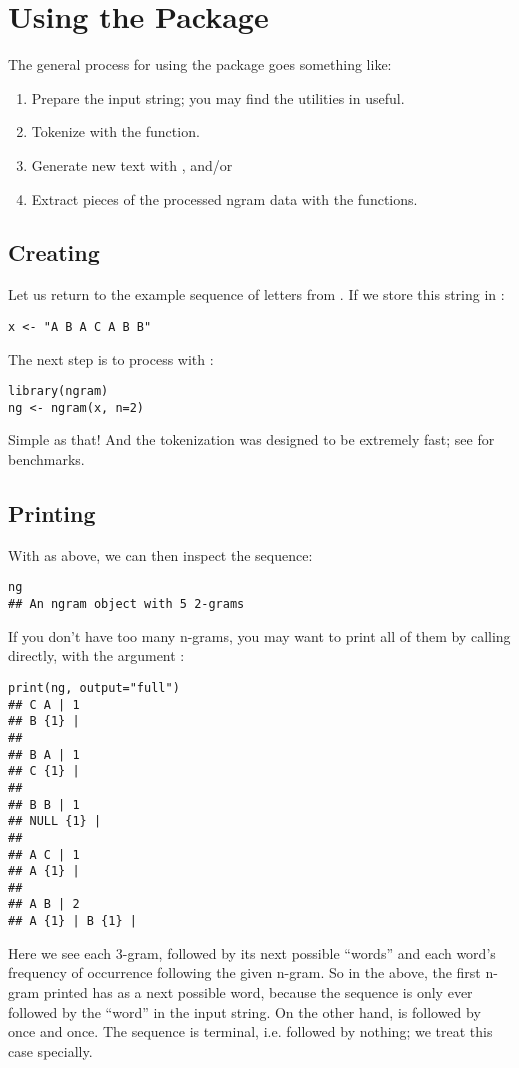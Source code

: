 \section{Using the Package}


The general process for using the  package goes something like:
\begin{enumerate}
  \item Prepare the input string; you may find the utilities in 
 useful.
  \item Tokenize with the  function.
  \item Generate new text with , and/or
  \item Extract pieces of the processed ngram data with the  functions.
\end{enumerate}



\subsection{Creating}

Let us return to the example sequence of letters from .  If 
we store this string in :
\begin{lstlisting}[language=rr]
x <- "A B A C A B B"
\end{lstlisting}
The next step is to process with :
\begin{lstlisting}[language=rr]
library(ngram)
ng <- ngram(x, n=2)
\end{lstlisting}
Simple as that!  And the tokenization was designed to be extremely fast; see 
 for benchmarks.



\subsection{Printing}

With  as above, we can then inspect the sequence:

\begin{lstlisting}[language=rr]
ng
## An ngram object with 5 2-grams
\end{lstlisting}
If you don't have too many n-grams, you may want to print all of them by 
calling 
 directly, with the  argument :
\begin{lstlisting}[language=rr]
print(ng, output="full")
## C A | 1 
## B {1} | 
## 
## B A | 1 
## C {1} | 
## 
## B B | 1 
## NULL {1} | 
## 
## A C | 1 
## A {1} | 
## 
## A B | 2 
## A {1} | B {1} | 
\end{lstlisting}
Here we see each 3-gram, followed by its next possible ``words'' and each 
word's frequency of occurrence following the given n-gram.  So in 
the above, the first n-gram printed  has  as a next 
possible word, because the sequence  is only ever followed by the 
``word''  in the input string.  On the other hand,  is 
followed by  once and  once.  The sequence  is 
terminal, i.e. followed by nothing; we treat this case specially.

